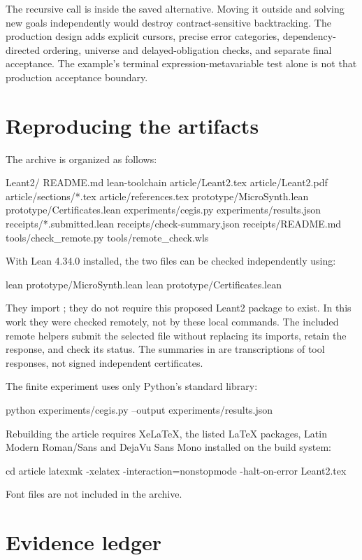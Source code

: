 The recursive call is inside the saved alternative. Moving it outside and
solving new goals independently would destroy contract-sensitive backtracking.
The production design adds explicit cursors, precise error categories,
dependency-directed ordering, universe and delayed-obligation checks, and
separate final acceptance. The example's terminal expression-metavariable test
alone is not that production acceptance boundary.

\section{Reproducing the artifacts}\label{app:reproduce}

The archive is organized as follows:
\begin{Code}
Leant2/
  README.md
  lean-toolchain
  article/Leant2.tex
  article/Leant2.pdf
  article/sections/*.tex
  article/references.tex
  prototype/MicroSynth.lean
  prototype/Certificates.lean
  experiments/cegis.py
  experiments/results.json
  receipts/*.submitted.lean
  receipts/check-summary.json
  receipts/README.md
  tools/check_remote.py
  tools/remote_check.wls
\end{Code}

With Lean 4.34.0 installed, the two files can be checked independently using:
\begin{Code}
lean prototype/MicroSynth.lean
lean prototype/Certificates.lean
\end{Code}
They import ; they do not require this proposed Leant2 package to
exist. In this work they were checked remotely, not by these local commands.
The included remote helpers submit the selected file without replacing its
imports, retain the response, and check its status. The summaries in
 are transcriptions of tool responses, not signed independent
certificates.

The finite experiment uses only Python's standard library:
\begin{Code}
python experiments/cegis.py --output experiments/results.json
\end{Code}
Rebuilding the article requires XeLaTeX, the listed LaTeX packages, Latin Modern Roman/Sans and DejaVu Sans Mono installed on the build system:
\begin{Code}
cd article
latexmk -xelatex -interaction=nonstopmode -halt-on-error Leant2.tex
\end{Code}
Font files are not included in the archive.

\section{Evidence ledger}

